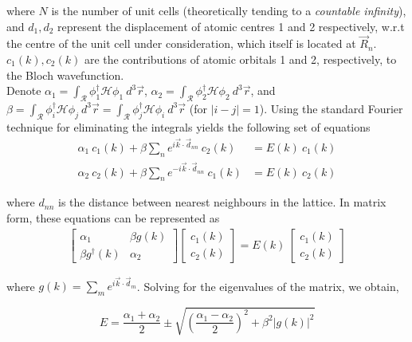 where $N$ is the number of unit cells (theoretically tending to a \textit{countable infinity}), and $d_{1}, d_{2}$ represent the displacement of atomic centres 1 and 2 respectively, w.r.t the centre of the unit cell under consideration, which itself is located at $\vec{R}_{n}$. $c_{1}(k), c_{2}(k)$ are the contributions of atomic orbitals 1 and 2, respectively, to the Bloch wavefunction. \\
Denote $\alpha_{1} = \int_{\mathcal{R}} \phi_{1}^{\dagger}\mathcal{H}\phi_{1}\: d^{3}\vec{r}$, $\alpha_{2} = \int_{\mathcal{R}} \phi_{2}^{\dagger}\mathcal{H}\phi_{2}\: d^{3}\vec{r}$, and $\beta = \int_{\mathcal{R}} \phi_{i}^{\dagger}\mathcal{H}\phi_{j}\: d^{3}\vec{r} = \int_{\mathcal{R}} \phi_{j}^{\dagger}\mathcal{H}\phi_{i}\: d^{3}\vec{r}$ (for $|i-j| = 1$). Using the standard Fourier technique for eliminating the integrals yields the following set of equations
\begin{equation*}
    \begin{aligned}
        \alpha_{1}\: c_{1}(k) + \beta \sum_{n}e^{i\vec{k}\cdot \vec{d}_{nn}} \:c_{2}(k) &= E(k) \: c_{1}(k) \\
        \alpha_{2}\: c_{2}(k) + \beta \sum_{n}e^{-i\vec{k}\cdot \vec{d}_{nn}} \:c_{1}(k) &= E(k) \: c_{2}(k)
    \end{aligned}
\end{equation*}

where $d_{nn}$ is the distance between nearest neighbours in the lattice. In matrix form, these equations can be represented as
\begin{gather*}
    \begin{bmatrix}
        \alpha_{1} & \beta g(k) \\ \beta g^{\dagger}(k) & \alpha_{2}
    \end{bmatrix}
    \begin{bmatrix}
        c_{1}(k) \\ c_{2}(k)
    \end{bmatrix}
    = E(k) \:
    \begin{bmatrix}
        c_{1}(k) \\ c_{2}(k)
    \end{bmatrix}
\end{gather*}  

where $g(k) = \sum_{m}e^{i\vec{k}\cdot \vec{d}_{m}}$. Solving for the eigenvalues of the matrix, we obtain, 

\begin{equation}
    E = \frac{\alpha_{1} + \alpha_{2}}{2} \pm \sqrt{\left(\frac{\alpha_{1} - \alpha_{2}}{2}\right)^{2} + \beta^{2}|g(k)|^{2}}
\end{equation}

